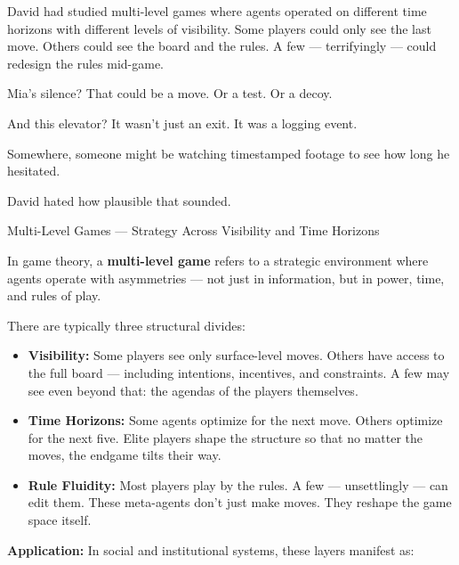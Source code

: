 David had studied multi-level games where agents operated on different time horizons with 
different levels of visibility.
Some players could only see the last move.
Others could see the board and the rules.
A few --- terrifyingly --- could redesign the rules mid-game.

Mia’s silence?
That could be a move.
Or a test.
Or a decoy.

And this elevator?
It wasn’t just an exit.
It was a logging event.

Somewhere, someone might be watching timestamped footage to see how long he hesitated.

David hated how plausible that sounded.

\medskip

\begin{TechnicalSidebar}{Multi-Level Games --- Strategy Across Visibility and Time Horizons}

    In game theory, a \textbf{multi-level game} refers to a strategic environment where agents operate with asymmetries — not just in information, but in power, time, and rules of play.
    
    \medskip
    
    There are typically three structural divides:

    \medskip
    
    \begin{itemize}
        \item \textbf{Visibility:} Some players see only surface-level moves. Others have access to the full board — including intentions, incentives, and constraints. A few may see even beyond that: the agendas of the players themselves.
    
        \item \textbf{Time Horizons:} Some agents optimize for the next move. Others optimize for the next five. Elite players shape the structure so that no matter the moves, the endgame tilts their way.
    
        \item \textbf{Rule Fluidity:} Most players play by the rules. A few — unsettlingly — can edit them. These meta-agents don’t just make moves. They reshape the game space itself.
    \end{itemize}
    
    \medskip
    
    \textbf{Application:} In social and institutional systems, these layers manifest as:

    \medskip
    

\end{TechnicalSidebar}
